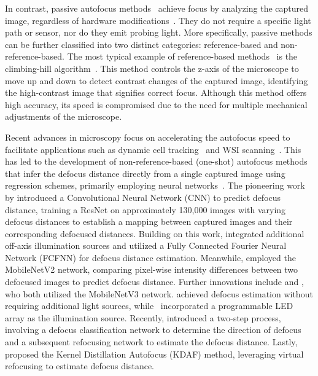 In contrast, passive autofocus methods~\cite{huang2024deformable,chinnasamy2022review,pinkard2019deep} achieve focus by analyzing the captured image, regardless of hardware modifications~\cite{subbarao1995optimal}. They do not require a specific light path or sensor, nor do they emit probing light. More specifically, passive methods can be further classified into two distinct categories: reference-based and non-reference-based.
The most typical example of reference-based methods~\cite{huang2024deformable} is the climbing-hill  algorithm~\cite{chinnasamy2022review}. This method controls the z-axis of the microscope to move up and down to detect contrast changes of the captured image, identifying the high-contrast image that signifies correct focus. Although this method offers high accuracy, its speed is compromised due to the need for multiple mechanical adjustments of the microscope.

Recent advances in microscopy focus on accelerating the autofocus speed to facilitate applications such as dynamic cell tracking~\cite{langehanenberg2009automated} and WSI scanning~\cite{li2022comprehensive}.
This has led to the development of non-reference-based (one-shot) autofocus methods that infer the defocus distance directly from a single captured image using regression schemes, primarily employing neural networks~\cite{pinkard2019deep}.
The pioneering work by \cite{jiang2018transform} introduced a Convolutional Neural Network (CNN) to predict defocus distance, training a ResNet on approximately 130,000 images with varying defocus distances to establish a mapping between captured images and their corresponding defocused distances.
Building on this work, \cite{pinkard2019deep} integrated additional off-axis illumination sources and utilized a Fully Connected Fourier Neural Network (FCFNN) for defocus distance estimation.
Meanwhile, \cite{dastidar2020whole} employed the MobileNetV2 network, comparing pixel-wise intensity differences between two defocused images to predict defocus distance.
Further innovations include \cite{liao2022deep} and \cite{xin2021low}, who both utilized the MobileNetV3 network. \cite{liao2022deep} achieved defocus estimation without requiring additional light sources, while~\cite{xin2021low} incorporated a programmable LED array as the illumination source.
Recently, \cite{li2022learning} introduced a two-step process, involving a defocus classification network to determine the direction of defocus and a subsequent refocusing network to estimate the defocus distance.
Lastly, \cite{gu2023single} proposed the Kernel Distillation Autofocus (KDAF) method, leveraging virtual refocusing to estimate defocus distance.

